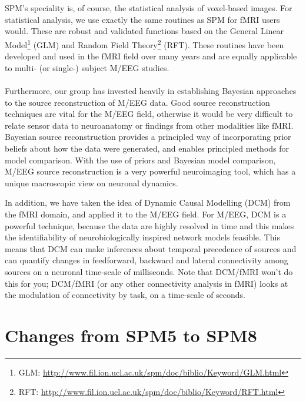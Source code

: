 \\
\\
SPM's speciality is, of course, the statistical analysis of voxel-based images. For statistical analysis, we use exactly the same routines as SPM for fMRI users would. These are robust and validated functions based on the General Linear Model\footnote{GLM: \url{http://www.fil.ion.ucl.ac.uk/spm/doc/biblio/Keyword/GLM.html}} (GLM) and Random Field Theory\footnote{RFT: \url{http://www.fil.ion.ucl.ac.uk/spm/doc/biblio/Keyword/RFT.html}} (RFT). These routines have been developed and used in the fMRI field over many years and are equally applicable to multi- (or single-) subject M/EEG studies.
\\
\\
Furthermore, our group has invested heavily in establishing Bayesian approaches to the source reconstruction of M/EEG data. Good source reconstruction techniques are vital for the M/EEG field, otherwise it would be very difficult to relate sensor data to neuroanatomy or findings from other modalities like fMRI. Bayesian source reconstruction provides a principled way of incorporating prior beliefs about how the data were generated, and enables principled methods for model comparison. With the use of priors and Bayesian model comparison, M/EEG source reconstruction is a very powerful neuroimaging tool, which has a unique macroscopic view on neuronal dynamics.

In addition, we have taken the idea of Dynamic Causal Modelling (DCM) from the fMRI domain, and applied it to the M/EEG field. For M/EEG, DCM is a powerful technique, because the data are highly resolved in time and this makes the identifiability of neurobiologically inspired network models feasible. This means that DCM can make inferences about temporal precedence of sources and can quantify changes in feedforward, backward and lateral connectivity among sources on a neuronal time-scale of milliseonds. Note that DCM/fMRI won't do this for you; DCM/fMRI (or any other connectivity analysis in fMRI) looks at the modulation of connectivity by task, on a time-scale of seconds.

\section{Changes from SPM5 to SPM8}

